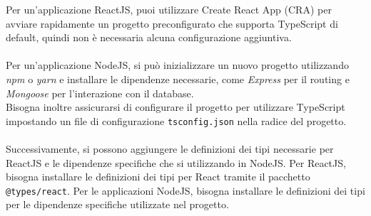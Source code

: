 \documentclass[a4paper, 12pt]{article}
\begin{document}
Per un'applicazione ReactJS, puoi utilizzare Create React App (CRA) per avviare rapidamente un progetto preconfigurato che supporta TypeScript di default, quindi non è necessaria alcuna configurazione aggiuntiva.\\ \\
Per un'applicazione NodeJS, si può inizializzare un nuovo progetto utilizzando \textit{npm} o \textit{yarn} e installare le dipendenze necessarie, come \textit{Express} per il routing e \textit{Mongoose} per l'interazione con il database. \\
Bisogna inoltre assicurarsi di configurare il progetto per utilizzare TypeScript impostando un file di configurazione \texttt{tsconfig.json} nella radice del progetto.\\\\
Successivamente, si possono aggiungere le definizioni dei tipi necessarie per ReactJS e le dipendenze specifiche che si utilizzando in NodeJS. Per ReactJS, bisogna installare le definizioni dei tipi per React tramite il pacchetto \texttt{@types/react}. Per le applicazioni NodeJS, bisogna installare le definizioni dei tipi per le dipendenze specifiche utilizzate nel progetto.\\
\end{document}
